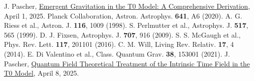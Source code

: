 \documentclass[12pt,a4paper]{article}
\begin{document}
\begin{thebibliography}{99}
		 J. Pascher, \href{https://github.com/jpascher/T0-Time-Mass-Duality/tree/main/2/pdf/English/EmergentGravT0En.pdf}{Emergent Gravitation in the T0 Model: A Comprehensive Derivation}, April 1, 2025.
		 Planck Collaboration, Astron. Astrophys. \textbf{641}, A6 (2020).
		 A. G. Riess et al., Astron. J. \textbf{116}, 1009 (1998).
		 S. Perlmutter et al., Astrophys. J. \textbf{517}, 565 (1999).
		 D. J. Fixsen, Astrophys. J. \textbf{707}, 916 (2009).
		 S. S. McGaugh et al., Phys. Rev. Lett. \textbf{117}, 201101 (2016).
		 C. M. Will, Living Rev. Relativ. \textbf{17}, 4 (2014).
		 E. Di Valentino et al., Class. Quantum Grav. \textbf{38}, 153001 (2021).
				 J. Pascher, \href{https://github.com/jpascher/T0-Time-Mass-Duality/tree/main/2/pdf/English/QFTIntrinsischesZeitT0En.pdf}{Quantum Field Theoretical Treatment of the Intrinsic Time Field in the T0 Model}, April 8, 2025.
	\end{thebibliography}
	
\end{document}
